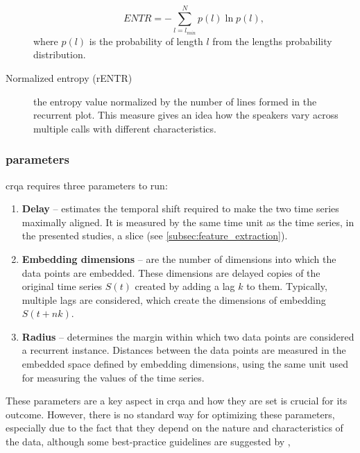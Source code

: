 \begin{description}
	\begin{equation}
		\label{eq:entr}
		ENTR = -\sum_{l=l_{min}}^{N} p(l) \ln p(l),
	\end{equation}
	where $p(l)$ is the probability of length $l$ from the lengths probability distribution.
	\item[Normalized entropy (rENTR)] the entropy value normalized by the number of lines formed in the recurrent plot.
	This measure gives an idea how the speakers vary across multiple calls with different characteristics.
	
\end{description}

\subsubsection{parameters}
\label{subsubsec:parameters_crqa}

\Ac{crqa} requires three parameters to run:

\begin{enumerate}
	\item \textbf{Delay} -- estimates the temporal shift required to make the two time series maximally aligned.
	It is measured by the same time unit as the time series, in the presented studies, a slice (see \cref{subsec:feature_extraction}).
	
	\item \textbf{Embedding dimensions} -- are the number of dimensions into which the data points are embedded.
	These dimensions are delayed copies of the original time series $S(t)$ created by adding a lag $k$ to them.
	Typically, multiple lags are considered, which create the dimensions of embedding $S(t + nk)$.
	
	\item \textbf{Radius} -- determines the margin within which two data points are considered a recurrent instance.
	Distances between the data points are measured in the embedded space defined by embedding dimensions, using the same unit used for measuring the values of the time series.
\end{enumerate}
%
These parameters are a key aspect in \ac{crqa} and how they are set is crucial for its outcome.
However, there is no standard way for optimizing these parameters, especially due to the fact that they depend on the nature and characteristics of the data, although some best-practice guidelines are suggested by \citet{Coco2014crqa-r},

